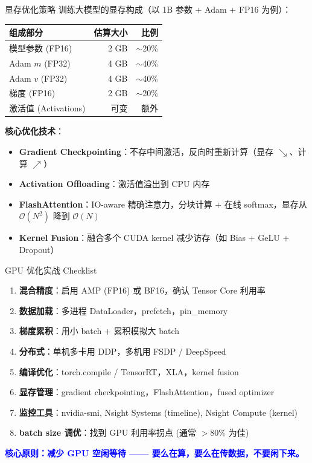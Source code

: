 \documentclass[11pt, aspectratio=169, svgnames, table, fontset=fandol]{ctexbeamer}
\begin{document}
\begin{frame}{显存优化策略}
  训练大模型的显存构成（以 1B 参数 + Adam + FP16 为例）：

  \begin{table}
    \small
    \begin{tabular}{l|r|r}
      \toprule
      组成部分 & 估算大小 & 比例 \\
      \midrule
      模型参数 (FP16) & 2 GB & $\sim$20\% \\
      Adam $m$ (FP32) & 4 GB & $\sim$40\% \\
      Adam $v$ (FP32) & 4 GB & $\sim$40\% \\
      梯度 (FP16) & 2 GB & $\sim$20\% \\
      激活值 (Activations) & 可变 & 额外 \\
      \bottomrule
    \end{tabular}
  \end{table}

  \vspace{4pt}
  \textbf{核心优化技术}：
  \begin{itemize}
    \item \textbf{Gradient Checkpointing}：不存中间激活，反向时重新计算（显存 $\searrow$、计算 $\nearrow$）
    \item \textbf{Activation Offloading}：激活值溢出到 CPU 内存
    \item \textbf{FlashAttention}：IO-aware 精确注意力，分块计算 + 在线 softmax，显存从 $\mathcal{O}(N^2)$ 降到 $\mathcal{O}(N)$
    \item \textbf{Kernel Fusion}：融合多个 CUDA kernel 减少访存（如 Bias + GeLU + Dropout）
  \end{itemize}
\end{frame}

\begin{frame}{GPU 优化实战 Checklist}
  \begin{enumerate}
    \item \textbf{混合精度}：启用 AMP (FP16) 或 BF16，确认 Tensor Core 利用率
    \item \textbf{数据加载}：多进程 DataLoader，prefetch，pin\_memory
    \item \textbf{梯度累积}：用小 batch + 累积模拟大 batch
    \item \textbf{分布式}：单机多卡用 DDP，多机用 FSDP / DeepSpeed
    \item \textbf{编译优化}：torch.compile / TensorRT，XLA，kernel fusion
    \item \textbf{显存管理}：gradient checkpointing，FlashAttention，fused optimizer
    \item \textbf{监控工具}：nvidia-smi, Nsight Systems (timeline), Nsight Compute (kernel)
    \item \textbf{batch size 调优}：找到 GPU 利用率拐点 (通常 $> 80\%$ 为佳)
  \end{enumerate}

  \vspace{6pt}
  \begin{center}
    \textcolor{blue}{\textbf{核心原则：减少 GPU 空闲等待 —— 要么在算，要么在传数据，不要闲下来。}}
  \end{center}
\end{frame}
\end{document}
